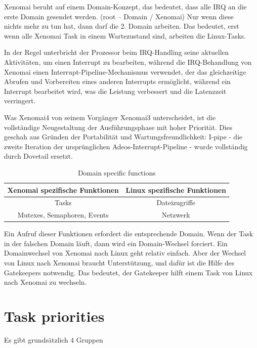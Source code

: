 \documentclass[MMR,Master,english]{twbook}
\begin{document}
\noindent Xenomai beruht auf einem Domain-Konzept, das bedeutet, dass alle IRQ an die erste Domain gesendet werden. (root – Domain / Xenomai)
Nur wenn diese nichts mehr zu tun hat, dann darf die 2. Domain arbeiten.
Das bedeutet, erst wenn alle Xenomai Task in einem Wartezustand sind, arbeiten die Linux-Tasks.

\noindent In der Regel unterbricht der Prozessor beim IRQ-Handling seine aktuellen Aktivitäten, um einen Interrupt zu bearbeiten, während die IRQ-Behandlung von Xenomai einen Interrupt-Pipeline-Mechanismus verwendet, der das gleichzeitige Abrufen und Vorbereiten eines anderen Interrupts ermöglicht, während ein Interrupt bearbeitet wird, was die Leistung verbessert und die Latenzzeit verringert.  

\noindent Was Xenomai4 von seinem Vorgänger Xenomai3 unterscheidet, ist die vollständige Neugestaltung der Ausführungsphase mit hoher Priorität. Dies geschah aus Gründen der Portabilität und Wartungsfreundlichkeit: I-pipe - die zweite Iteration der ursprünglichen Adeos-Interrupt-Pipeline - wurde vollständig durch Dovetail ersetzt. 

\begin{table}[H]
    \centering
    \caption[Domain specific functions]{Domain specific functions}
    \label{tab:domain_specific_functions}
    \begin{tabular}{|c|c|}
        \hline
        \textbf{Xenomai spezifische Funktionen} & \textbf{Linux spezifische Funktionen} \\ \hline
        Tasks    & Dateizugriffe \\ \hline
        Mutexes, Semaphoren, Events & Netzwerk \\ \hline
    \end{tabular}
\end{table}


\noindent Ein Aufruf dieser Funktionen erfordert die entsprechende Domain. Wenn der Task in der falschen Domain läuft, dann wird ein Domain-Wechsel forciert.
Ein Domainwechsel von Xenomai nach Linux geht relativ einfach. Aber der Wechsel von Linux nach Xenomai braucht Unterstützung, und dafür ist die Hilfe des Gatekeepers notwendig. Das bedeutet, der Gatekeeper hilft einem Task von Linux nach Xenomai zu wechseln.

\section{Task priorities}
Es gibt grundsätzlich 4 Gruppen
\end{document}
